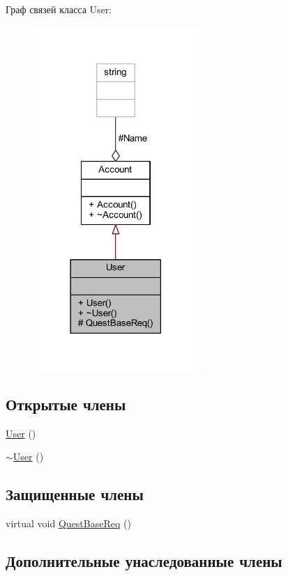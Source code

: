 Граф связей класса User\+:\nopagebreak
\begin{figure}[H]
\begin{center}
\leavevmode
\includegraphics[width=177pt]{d6/d8a/class_user__coll__graph}
\end{center}
\end{figure}
\subsection*{Открытые члены}
\begin{DoxyCompactItemize}
\item 
\hyperlink{class_user_a4a0137053e591fbb79d9057dd7d2283d}{User} ()
\item 
\hyperlink{class_user_ac00b72ad64eb4149f7b21b9f5468c2b2}{$\sim$\+User} ()
\end{DoxyCompactItemize}
\subsection*{Защищенные члены}
\begin{DoxyCompactItemize}
\item 
virtual void \hyperlink{class_user_acadb47688ed7480653f51686380425bb}{Quest\+Base\+Req} ()
\end{DoxyCompactItemize}
\subsection*{Дополнительные унаследованные члены}


